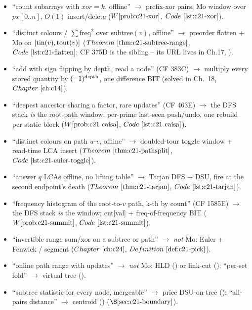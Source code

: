 \begin{itemize}[nosep, leftmargin=1.4em]
  \item ``count subarrays with \(\mathit{xor}=k\), offline'' \(\to\) prefix-xor pairs,
        Mo window over \(px[0..n]\), \(O(1)\) insert/delete
        (\(\probref{c21-xor}\), \(\coderef{c21-xor}\)).
  \item ``distinct colours / \(\sum\mathrm{freq}^2\) over subtree\((v)\), offline''
        \(\to\) preorder flatten + Mo on \([\operatorname{tin}(v),\operatorname{tout}(v)]\)
        (\(\thmref{c21-subtree-range}\), \(\coderef{c21-flatten}\); CF 375D is the
        sibling -- its URL lives in Ch.17, ).
  \item ``add with sign flipping by depth, read a node'' (CF 383C) \(\to\) multiply
        every stored quantity by \((-1)^{\operatorname{depth}}\), one difference BIT
        (solved in Ch.~18, \(\chref{c14}\)).
  \item ``deepest ancestor sharing a factor, rare updates'' (CF 463E) \(\to\) the
        DFS stack \emph{is} the root-path window; per-prime last-seen push/undo,
        one rebuild per static block (\(\probref{c21-caisa}\), \(\coderef{c21-caisa}\)).
  \item ``distinct colours on path \(u\)-\(v\), offline'' \(\to\) doubled-tour toggle
        window + read-time LCA insert (\(\thmref{c21-pathsplit}\),
        \(\coderef{c21-euler-toggle}\)).
  \item ``answer \(q\) LCAs offline, no lifting table'' \(\to\) Tarjan DFS \(+\) DSU,
        fire at the second endpoint's death (\(\thmref{c21-tarjan}\),
        \(\coderef{c21-tarjan}\)).
  \item ``frequency histogram of the root-to-\(v\) path, k-th by count'' (CF 1585E)
        \(\to\) the DFS stack \emph{is} the window; cnt[val] + freq-of-frequency BIT
        (\(\probref{c21-summit}\), \(\coderef{c21-summit}\)).
  \item ``invertible range sum/xor on a subtree or path'' \(\to\) \emph{not} Mo:
        Euler \(+\) Fenwick / segment (\(\chref{c24}\), \(\defref{c21-pick}\)).
  \item ``online path range with updates'' \(\to\) \emph{not} Mo: HLD ()
        or link-cut (); ``per-set fold'' \(\to\) virtual tree ().
  \item ``subtree statistic for every node, mergeable'' \(\to\) price DSU-on-tree
        (); ``all-pairs distance'' \(\to\) centroid ()
        (\(\secref{c21-boundary}\)).
\end{itemize}

